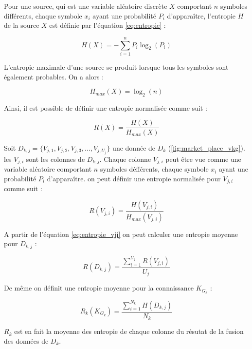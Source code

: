 Pour une source, qui est une variable aléatoire discrète $X$ comportant $n$ symboles différents, chaque symbole $x_i$ ayant une probabilité $P_i$ d'apparaître, l'entropie $H$ de la source $X$ est définie par l'équation \ref{eq:entropie} :

\begin{equation} \label{eq:entropie}
    H(X) = -\sum_{i=1}^{n} P_i \log_2(P_i)
\end{equation}

L'entropie maximale d'une source se produit lorsque tous les symboles sont également probables. On a alors :

\begin{equation} \label{eq:entropie_max}
    H_{max}(X) = \log_2(n)
\end{equation}

Ainsi, il est possible de définir une entropie normalisée comme suit :

\begin{equation} \label{eq:entropie_norm}
    R(X) = \frac{H(X)}{H_{max}(X)}
\end{equation}

Soit $D_{k,j} = \{V_{j,1}, V_{j,2}, V_{j,3}, ..., V_{j,U_j}\}$ une donnée de $D_k$ (\autoref{fig:market_place_vkg}). les $V_{j,i}$ sont les colonnes de $D_{k,j}$. Chaque colonne $V_{j,i}$ peut être vue comme une variable aléatoire comportant $n$ symboles défférents, chaque symbole $x_i$ ayant une probabilité $P_i$ d'apparaître. on peut définir une entropie normalisée pour $V_{j,i}$ comme suit :

\begin{equation} \label{eq:entropie_vji}
    R(V_{j,i}) = \frac{H(V_{j,i})}{H_{max}(V_{j,i})}
\end{equation}

A partir de l'équation \ref{eq:entropie_vji} on peut calculer une entropie moyenne pour $D_{k,j}$ :

\begin{equation} \label{eq:entropie_dkj}
    R(D_{k,j}) = \frac{\sum_{i=1}^{U_j} R(V_{j,i})}{U_j}
\end{equation}

De même on définit une entropie moyenne pour la connaissance $K_{G_k}$ :

\begin{equation} \label{eq:entropie_kg}
    R_k(K_{G_k}) = \frac{\sum_{i=1}^{N_k} H(D_{k,j})}{N_k}
\end{equation}

$R_k$ est en fait la moyenne des entropie de chaque colonne du résutat de la fusion des données de $D_k$.

